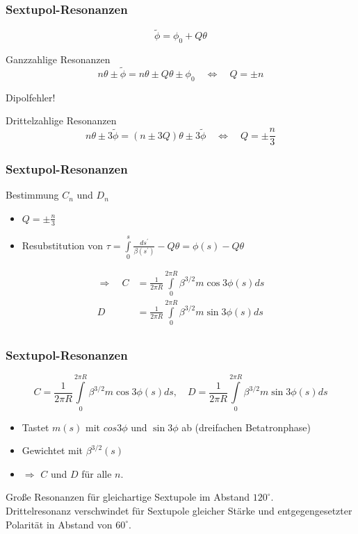 \documentclass[hyperref={pdfpagelabels=false}]{beamer}
\begin{document}
\begin{frame}
\frametitle{Sextupol-Resonanzen}
\begin{equation*}
\tilde{\phi} = \phi_0 + Q\theta
\end{equation*}

Ganzzahlige Resonanzen 
\begin{equation*}
n\theta \pm \tilde{\phi} = n\theta \pm Q\theta \pm \phi_0 \quad \Leftrightarrow \quad Q = \pm n
\end{equation*}
\begin{flushright}
Dipolfehler!
\end{flushright}


Drittelzahlige Resonanzen
\begin{equation*}
n\theta \pm 3\tilde{\phi} = (n\pm 3Q) \theta \pm 3\tilde{\phi}\quad \Leftrightarrow \quad Q = \pm \frac{n}{3}
\end{equation*}
\end{frame}

\begin{frame}
\frametitle{Sextupol-Resonanzen}
Bestimmung  $C_n$ und $D_n$
\begin{itemize}
\item $Q = \pm \frac{n}{3}\quad$
\item Resubstitution von $\tau = \int\limits_0^s\frac{ds^\prime}{\beta(s^\prime)}-Q\theta = \phi(s) - Q\theta$
\end{itemize}\pause
\begin{align*}
\Rightarrow \quad C &= \frac{1}{2\pi R} \int\limits_0^{2\pi R} \beta^{3/2} m \cos3\phi(s) ds\\
D &= \frac{1}{2\pi R} \int\limits_0^{2\pi R} \beta^{3/2} m \sin3\phi(s) ds\\
\end{align*}

\end{frame}

\begin{frame}
\frametitle{Sextupol-Resonanzen}
\begin{equation*}
C = \frac{1}{2\pi R} \int\limits_0^{2\pi R} \beta^{3/2} m \cos3\phi(s) ds,\quad D = \frac{1}{2\pi R} \int\limits_0^{2\pi R} \beta^{3/2} m \sin3\phi(s) ds
\end{equation*}
\begin{itemize}
\item Tastet $m(s)$ mit $cos 3\phi$ und $\sin 3\phi$ ab (dreifachen Betatronphase)
\item Gewichtet mit $\beta^{3/2}(s)$
\item $\Rightarrow$ $C$ und $D$ für alle $n$.
\end{itemize}
\pause
Große Resonanzen für gleichartige Sextupole im Abstand $120^\circ$.\\\pause
Drittelresonanz verschwindet für Sextupole gleicher Stärke und entgegengesetzter Polarität in Abstand von $60^\circ$.
\end{frame}
\end{document}
